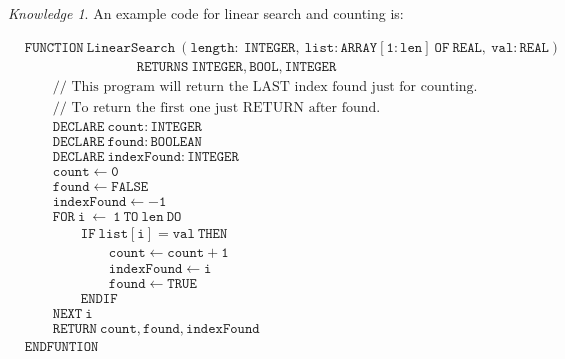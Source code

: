 \documentclass[8pt]{article}
\theoremstyle{remark}
\newtheorem{knowledge}{Knowledge}[subsection]
\begin{document}
            \begin{knowledge}
                An example code for linear search and counting is:

                \begin{align*}
                    &\mathtt{FUNCTION\ LinearSearch\ (length:\ INTEGER,\ list:ARRAY [1:len]\ OF\ REAL,\ val:REAL)}\\
                    &\qquad \qquad \qquad \qquad \mathtt{RETURNS\ INTEGER, BOOL, INTEGER}\\
                    &\qquad \text{// This program will return the LAST index found just for counting.}\\
                    &\qquad \text{// To return the first one just RETURN after found.}\\
                    &\qquad \mathtt{DECLARE\ count:INTEGER}\\
                    &\qquad \mathtt{DECLARE\ found:BOOLEAN}\\
                    &\qquad \mathtt{DECLARE\ indexFound:INTEGER}\\
                    &\qquad \mathtt{count \leftarrow 0}\\
                    &\qquad \mathtt{found \leftarrow FALSE}\\
                    &\qquad \mathtt{indexFound \leftarrow -1}\\
                    &\qquad \mathtt{FOR\ i\ \leftarrow\ 1\ TO\ len\ DO}\\
                    &\qquad \qquad \mathtt{IF\ list[i]=val\ THEN}\\
                    &\qquad \qquad \qquad \mathtt{count \leftarrow count + 1}\\
                    &\qquad \qquad \qquad \mathtt{indexFound \leftarrow i}\\
                    &\qquad \qquad \qquad \mathtt{found \leftarrow TRUE}\\
                    &\qquad \qquad \mathtt{ENDIF}\\
                    &\qquad \mathtt{NEXT\ i}\\
                    &\qquad \mathtt{RETURN\ count, found, indexFound}\\
                    &\mathtt{ENDFUNTION}
                \end{align*}
            \end{knowledge}
\end{document}
